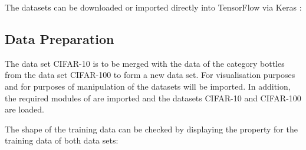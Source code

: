 The datasets can be downloaded or imported directly into TensorFlow via Keras \cite{TensorFlow.14.12.2020,kaggle.21.09.2020,KaggleCifar100:2020,Krizhevsky:2017}:

\medskip








\subsection{Data Preparation}

The data set CIFAR-10 is to be merged with the data of the category \glqq bottles\grqq{} from the data set CIFAR-100 to form a new data set. For visualisation purposes  and for purposes of manipulation of the datasets  will be imported. In addition, the required modules of  are imported and the datasets CIFAR-10 and CIFAR-100 are loaded.

\medskip









\medskip

The shape of the training data can be checked by displaying the property  for the training data of both data sets:


\medskip


